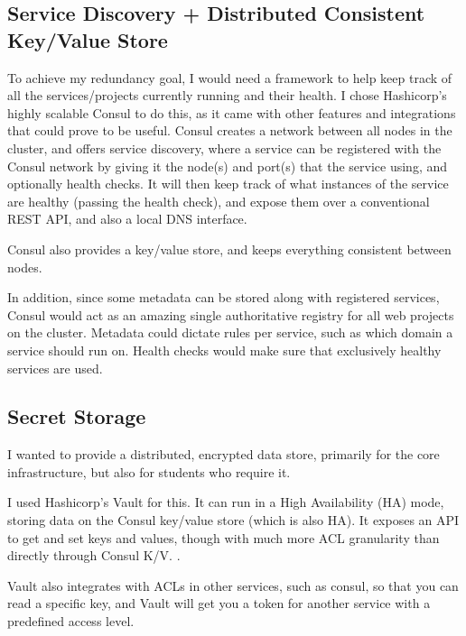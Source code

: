 \documentclass{article}
\begin{document}
\subsection{Service Discovery + Distributed Consistent Key/Value Store}
To achieve my redundancy goal, I would need a framework to help keep track of all the services/projects currently running and their health. I chose Hashicorp's highly scalable Consul to do this, as it came with other features and integrations that could prove to be useful. Consul creates a network between all nodes in the cluster, and offers service discovery, where a service can be registered with the Consul network by giving it the node(s) and port(s) that the service using, and optionally health checks. It will then keep track of what instances of the service are healthy (passing the health check), and expose them over a conventional REST API, and also a local DNS interface. 

Consul also provides a key/value store, and keeps everything consistent between nodes.

In addition, since some metadata can be stored along with registered services, Consul would act as an amazing single authoritative registry for all web projects on the cluster. Metadata could dictate rules per service, such as which domain a service should run on. Health checks would make sure that exclusively healthy services are used.

\subsection{Secret Storage}
I wanted to provide a distributed, encrypted data store, primarily for the core infrastructure, but also for students who require it. 

I used Hashicorp's Vault for this. It can run in a High Availability (HA) mode, storing data on the Consul key/value store (which is also HA). It exposes an API to get and set keys and values, though with much more ACL granularity than directly through Consul K/V. .

Vault also integrates with ACLs in other services, such as consul, so that you can read a specific key, and Vault will get you a token for another service with a predefined access level. 
\end{document}
